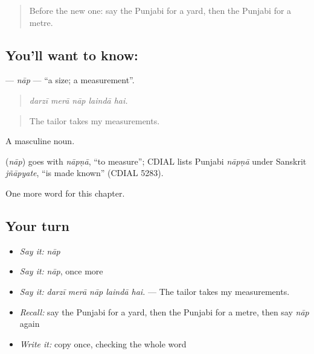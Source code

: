 \begin{quote}
Before the new one: say the Punjabi for a yard, then the Punjabi for a metre.
\end{quote}

\subsection*{You'll want to know: }
\textbf{} — \emph{nāp} — \textquotedblleft{}a size; a measurement\textquotedblright{}.

\begin{quote}
    
\end{quote}

\begin{quote}
\emph{darzī merā nāp laindā hai.}
\end{quote}

\begin{quote}
The tailor takes my measurements.
\end{quote}

A masculine noun.

\begin{cousinweb}
\textbf{} (\emph{nāp}) goes with \emph{nāpṇā}, \textquotedblleft{}to measure\textquotedblright{}; CDIAL lists Punjabi \emph{nāpṇā} under Sanskrit \emph{jñāpyate}, \textquotedblleft{}is made known\textquotedblright{} (CDIAL 5283).
\end{cousinweb}

\begin{grammarlens}[title={What you've built}]
One more word for this chapter.
\end{grammarlens}

\subsection*{Your turn}
\begin{itemize}
\raggedright
  \item \emph{Say it:} \emph{nāp}
  \item \emph{Say it:} \emph{nāp}, once more
  \item \emph{Say it:} \emph{darzī merā nāp laindā hai.} — The tailor takes my measurements.
  \item \emph{Recall:} say the Punjabi for a yard, then the Punjabi for a metre, then say \emph{nāp} again
  \item \emph{Write it:} copy \textbf{} once, checking the whole word
\end{itemize}

